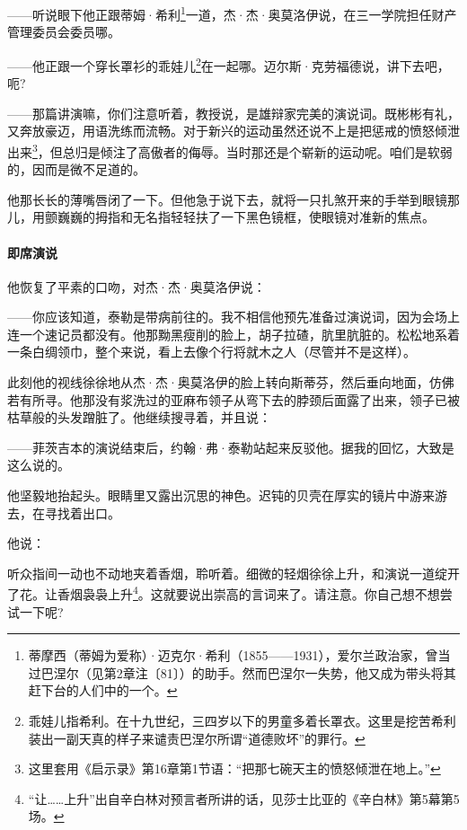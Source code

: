 \par ——听说眼下他正跟蒂姆·希利\footnote{蒂摩西（蒂姆为爱称）·迈克尔·希利（1855——1931），爱尔兰政治家，曾当过巴涅尔（见第2章注〔81〕）的助手。然而巴涅尔一失势，他又成为带头将其赶下台的人们中的一个。}一道，杰·杰·奥莫洛伊说，在三一学院担任财产管理委员会委员哪。
\par ——他正跟一个穿长罩衫的乖娃儿\footnote{乖娃儿指希利。在十九世纪，三四岁以下的男童多着长罩衣。这里是挖苦希利装出一副天真的样子来谴责巴涅尔所谓“道德败坏”的罪行。}在一起哪。迈尔斯·克劳福德说，讲下去吧，呃?
\par ——那篇讲演嘛，你们注意听着，教授说，是雄辩家完美的演说词。既彬彬有礼，又奔放豪迈，用语洗练而流畅。对于新兴的运动虽然还说不上是把惩戒的愤怒倾泄出来\footnote{这里套用《启示录》第16章第1节语：“把那七碗天主的愤怒倾泄在地上。”}，但总归是倾注了高傲者的侮辱。当时那还是个崭新的运动呢。咱们是软弱的，因而是微不足道的。
\par 他那长长的薄嘴唇闭了一下。但他急于说下去，就将一只扎煞开来的手举到眼镜那儿，用颤巍巍的拇指和无名指轻轻扶了一下黑色镜框，使眼镜对准新的焦点。
\paragraph*{即席演说}
\par 他恢复了平素的口吻，对杰·杰·奥莫洛伊说：
\par ——你应该知道，泰勒是带病前往的。我不相信他预先准备过演说词，因为会场上连一个速记员都没有。他那黝黑瘦削的脸上，胡子拉碴，肮里肮脏的。松松地系着一条白绸领巾，整个来说，看上去像个行将就木之人（尽管并不是这样）。
\par 此刻他的视线徐徐地从杰·杰·奥莫洛伊的脸上转向斯蒂芬，然后垂向地面，仿佛若有所寻。他那没有浆洗过的亚麻布领子从弯下去的脖颈后面露了出来，领子已被枯草般的头发蹭脏了。他继续搜寻着，并且说：
\par ——菲茨吉本的演说结束后，约翰·弗·泰勒站起来反驳他。据我的回忆，大致是这么说的。
\par 他坚毅地抬起头。眼睛里又露出沉思的神色。迟钝的贝壳在厚实的镜片中游来游去，在寻找着出口。
\par 他说：
\par 听众指间一动也不动地夹着香烟，聆听着。细微的轻烟徐徐上升，和演说一道绽开了花。让香烟袅袅上升\footnote{“让……上升”出自辛白林对预言者所讲的话，见莎士比亚的《辛白林》第5幕第5场。}。这就要说出崇高的言词来了。请注意。你自己想不想尝试一下呢?

